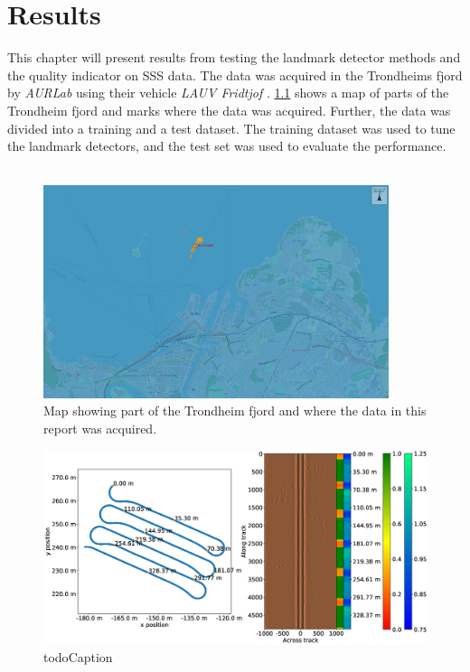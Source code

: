 \chapter{Results}

This chapter will present results from testing the landmark detector methods and the quality indicator on SSS data. The data was acquired in the Trondheims fjord by \textit{AURLab} using their vehicle \textit{LAUV Fridtjof} \cite{LAUVNTNU}. \cref{fig:neptus_screenshot} shows a map of parts of the Trondheim fjord and marks where the data was acquired. Further, the data was divided into a training and a test dataset. The training dataset was used to tune the landmark detectors, and the test set was used to evaluate the performance. 
\\
\\

\begin{figure} [h]%
  \centering
  \includegraphics[width=0.9\textwidth]{figures/neptus_screenshot.png}
  \caption{Map showing part of the Trondheim fjord and where the data in this report was acquired.}
  \label{fig:neptus_screenshot}
\end{figure}

\begin{figure}
    \centering
    \includegraphics[trim=0cm 2cm 0cm 3cm, clip=true, width=1.0\textwidth]{figures/path_sonar_colorbars_training.eps}
    \caption{todo{Caption}}
    \label{fig:path_sonar_colorbars}
\end{figure}

